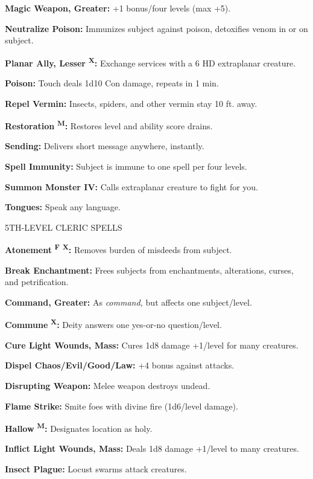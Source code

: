 \documentclass{article}
\begin{document}
\textbf{Magic Weapon, Greater:} +1 bonus/four levels (max +5).

\textbf{Neutralize Poison:} Immunizes subject against poison, detoxifies venom 
in or on subject.

\textbf{Planar Ally, Lesser }\textsuperscript{\textbf{X}}\textbf{:} Exchange services 
with a 6 HD extraplanar creature.

\textbf{Poison:} Touch deals 1d10 Con damage, repeats in 1 min.

\textbf{Repel Vermin:} Insects, spiders, and other vermin stay 10 ft. away.

\textbf{Restoration }\textsuperscript{\textbf{M}}\textbf{:} Restores level and 
ability score drains.

\textbf{Sending:} Delivers short message anywhere, instantly.

\textbf{Spell Immunity:} Subject is immune to one spell per four levels.

\textbf{Summon Monster IV:} Calls extraplanar creature to fight for you.

\textbf{Tongues:} Speak any language.

5TH-LEVEL CLERIC SPELLS

\textbf{Atonement }\textsuperscript{\textbf{F}}{\scriptsize{}\textbf{ }}\textsuperscript{\textbf{X}}\textbf{:} 
Removes burden of misdeeds from subject.

\textbf{Break Enchantment:} Frees subjects from enchantments, alterations, curses, 
and petrification.

\textbf{Command, Greater:} As \textit{command, }but affects one subject/level.

\textbf{Commune }\textsuperscript{\textbf{X}}\textbf{:} Deity answers one yes-or-no 
question/level.

\textbf{Cure Light Wounds, Mass:} Cures 1d8 damage +1/level for many creatures.

\textbf{Dispel Chaos/Evil/Good/Law:} +4 bonus against attacks.

\textbf{Disrupting Weapon: }Melee weapon destroys undead.

\textbf{Flame Strike:} Smite foes with divine fire (1d6/level damage).

\textbf{Hallow }\textsuperscript{\textbf{M}}\textbf{:} Designates location as holy.

\textbf{Inflict Light Wounds, Mass:} Deals 1d8 damage +1/level to many creatures.

\textbf{Insect Plague:} Locust swarms attack creatures.
\end{document}
